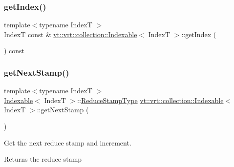 \subsubsection{\texorpdfstring{get\+Index()}{getIndex()}}
{\footnotesize\ttfamily template$<$typename IndexT $>$ \\
IndexT const  \& \hyperlink{structvt_1_1vrt_1_1collection_1_1_indexable}{vt\+::vrt\+::collection\+::\+Indexable}$<$ IndexT $>$\+::get\+Index (\begin{DoxyParamCaption}{ }\end{DoxyParamCaption}) const}

\mbox{\label{structvt_1_1vrt_1_1collection_1_1_indexable_ac85630baeeee8fa34289eea08f6743af}} 
\subsubsection{\texorpdfstring{get\+Next\+Stamp()}{getNextStamp()}}
{\footnotesize\ttfamily template$<$typename IndexT $>$ \\
\hyperlink{structvt_1_1vrt_1_1collection_1_1_indexable}{Indexable}$<$ IndexT $>$\+::\hyperlink{structvt_1_1vrt_1_1collection_1_1_indexable_a0369a8abcf13550caec736365f7fb30f}{Reduce\+Stamp\+Type} \hyperlink{structvt_1_1vrt_1_1collection_1_1_indexable}{vt\+::vrt\+::collection\+::\+Indexable}$<$ IndexT $>$\+::get\+Next\+Stamp (\begin{DoxyParamCaption}{ }\end{DoxyParamCaption})}



Get the next reduce stamp and increment. 

\begin{DoxyReturn}{Returns}
the reduce stamp 
\end{DoxyReturn}
\mbox{\label{structvt_1_1vrt_1_1collection_1_1_indexable_a6c95be93183665a0d03c149207f000f9}} 
